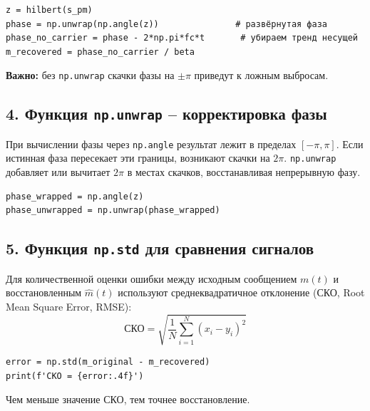 \documentclass[12pt,a4paper,openany]{book}
\begin{document}
\begin{Verbatim}[fontsize=\small, breaklines, breakanywhere]
z = hilbert(s_pm)
phase = np.unwrap(np.angle(z))               # развёрнутая фаза
phase_no_carrier = phase - 2*np.pi*fc*t       # убираем тренд несущей
m_recovered = phase_no_carrier / beta
\end{Verbatim}

\textbf{Важно:} без \texttt{np.\allowbreak{}unwrap} скачки фазы на \(\pm\pi\) приведут к ложным выбросам.

\subsection*{\texorpdfstring{4. Функция \texttt{np.\allowbreak{}unwrap} -- корректировка фазы}{4. Функция np.unwrap -- корректировка фазы}}

При вычислении фазы через \texttt{np.\allowbreak{}angle} результат лежит в пределах \([-\pi, \pi]\). Если истинная фаза пересекает эти границы, возникают скачки на \(2\pi\). \texttt{np.\allowbreak{}unwrap} добавляет или вычитает \(2\pi\) в местах скачков, восстанавливая непрерывную фазу.

\begin{Verbatim}[fontsize=\small, breaklines, breakanywhere]
phase_wrapped = np.angle(z)
phase_unwrapped = np.unwrap(phase_wrapped)
\end{Verbatim}

\subsection*{\texorpdfstring{5. Функция \texttt{np.\allowbreak{}std} для сравнения сигналов}{5. Функция np.std для сравнения сигналов}}

Для количественной оценки ошибки между исходным сообщением \(m(t)\) и восстановленным \(\hat{m}(t)\) используют среднеквадратичное отклонение (СКО, Root Mean Square Error, RMSE):
\[
\text{СКО} = \sqrt{\frac{1}{N} \sum_{i=1}^{N} (x_i - y_i)^2}
\]

\begin{Verbatim}[fontsize=\small, breaklines, breakanywhere]
error = np.std(m_original - m_recovered)
print(f'СКО = {error:.4f}')
\end{Verbatim}

Чем меньше значение СКО, тем точнее восстановление.
\end{document}
